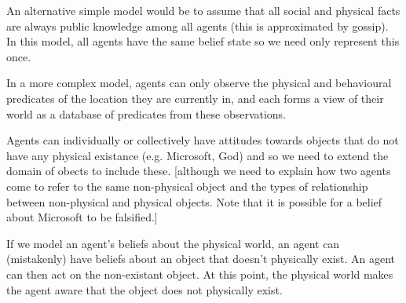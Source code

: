 \documentclass[a4paper]{article}
\begin{document}
An alternative simple model would be to assume that all social and physical facts are always public knowledge among all agents (this is approximated by gossip). In this model, all agents have the same belief state so we need only represent this once.

In a more complex model, agents can only observe the physical and behavioural predicates of the location they are currently in, and each forms a view of their world as a database of predicates from these observations.

Agents can individually or collectively have attitudes towards objects that do not have any physical existance (e.g. Microsoft, God) and so we need to extend the domain of obects to include these. [although we need to explain how two agents come to refer to the same non-physical object and the types of relationship between non-physical and physical objects. Note that it is possible for a belief about Microsoft to be falsified.] 

If we model an agent's beliefs about the physical world, an agent can (mistakenly) have beliefs about an object that doesn't physically exist. An agent can then act on the non-existant object. At this point, the physical world makes the agent aware that the object does not physically exist.
\end{document}
